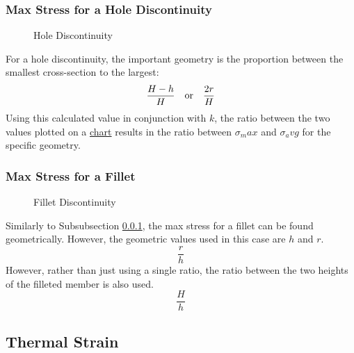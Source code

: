 \documentclass[12pt]{article}
\begin{document}
\subsubsection{Max Stress for a Hole Discontinuity}
\label{sssec:maxStressForAHoleDiscontinuity}

\begin{wrapfigure}[]{r}{0.5\textwidth}
  \vspace{-50pt}
  \centering
  
  \caption{Hole Discontinuity}
  \label{fig:025_b}
\end{wrapfigure}

For a hole discontinuity, the important geometry is the proportion between the smallest cross-section to the largest:
\begin{equation*}
  \frac{H-h}{H}\ \ \ \textup{or}\ \ \ \frac{2r}{H}
\end{equation*}
Using this calculated value in conjunction with $k$, the ratio between the two values plotted on a \href{https://research.iaun.ac.ir/pd/jjfesharaki/pdfs/uploadfile_9038.pdf}{chart} results in the ratio between $\sigma_max$ and $\sigma_avg$ for the specific geometry.

\subsubsection{Max Stress for a Fillet}
\label{sssec:maxStressForAFillet}

\begin{wrapfigure}[11]{r}{0.5\textwidth}
  \vspace{-75pt}
  \centering
  
  \caption{Fillet Discontinuity}
  \label{fig:054_b}
\end{wrapfigure}

Similarly to Subsubsection \ref{sssec:maxStressForAHoleDiscontinuity}, the max stress for a fillet can be found geometrically. However, the geometric values used in this case are $h$ and $r$. 
\begin{equation*}
  \frac{r}{h}
\end{equation*}
However, rather than just using a single ratio, the ratio between the two heights of the filleted member is also used.
\begin{equation*}
  \frac{H}{h}
\end{equation*}

\subsection{Thermal Strain}
\label{ssec:thermalStrain}
\end{document}
